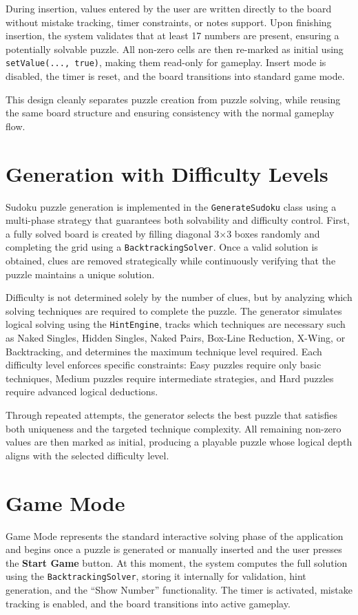 \documentclass[12pt,a4paper]{article}
\begin{document}
During insertion, values entered by the user are written directly to the board without mistake tracking, timer constraints, or notes support. Upon finishing insertion, the system validates that at least 17 numbers are present, ensuring a potentially solvable puzzle. All non-zero cells are then re-marked as initial using \texttt{setValue(..., true)}, making them read-only for gameplay. Insert mode is disabled, the timer is reset, and the board transitions into standard game mode.

This design cleanly separates puzzle creation from puzzle solving, while reusing the same board structure and ensuring consistency with the normal gameplay flow.

\section{Generation with Difficulty Levels}
Sudoku puzzle generation is implemented in the \texttt{GenerateSudoku} class using a multi-phase strategy that guarantees both solvability and difficulty control. First, a fully solved board is created by filling diagonal 3$\times$3 boxes randomly and completing the grid using a \texttt{BacktrackingSolver}. Once a valid solution is obtained, clues are removed strategically while continuously verifying that the puzzle maintains a unique solution.

Difficulty is not determined solely by the number of clues, but by analyzing which solving techniques are required to complete the puzzle. The generator simulates logical solving using the \texttt{HintEngine}, tracks which techniques are necessary such as Naked Singles, Hidden Singles, Naked Pairs, Box-Line Reduction, X-Wing, or Backtracking, and determines the maximum technique level required. Each difficulty level enforces specific constraints: Easy puzzles require only basic techniques, Medium puzzles require intermediate strategies, and Hard puzzles require advanced logical deductions.

Through repeated attempts, the generator selects the best puzzle that satisfies both uniqueness and the targeted technique complexity. All remaining non-zero values are then marked as initial, producing a playable puzzle whose logical depth aligns with the selected difficulty level.

\section{Game Mode}
Game Mode represents the standard interactive solving phase of the application and begins once a puzzle is generated or manually inserted and the user presses the \textbf{Start Game} button. At this moment, the system computes the full solution using the \texttt{BacktrackingSolver}, storing it internally for validation, hint generation, and the “Show Number” functionality. The timer is activated, mistake tracking is enabled, and the board transitions into active gameplay.
\end{document}
